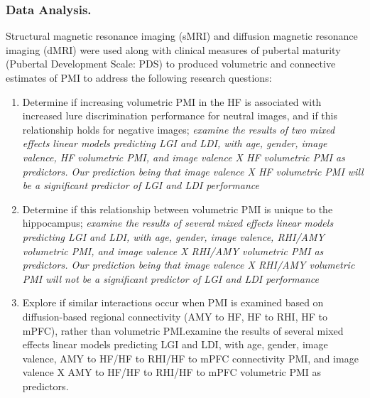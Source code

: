 \documentclass[11pt]{article}
\begin{document}
\subsubsection*{Data Analysis.} Structural magnetic resonance imaging (sMRI) and
diffusion magnetic resonance imaging (dMRI) were used along with clinical measures of
pubertal maturity (Pubertal Development Scale: {PDS}) to produced volumetric and
connective estimates of PMI to address the following research questions:
\begin{enumerate}
    \item Determine if increasing volumetric PMI in the HF is associated with increased
          lure discrimination performance for neutral images, and if this relationship holds for
          negative images; \textit{examine the results of two mixed effects linear models predicting LGI and LDI, with
              age, gender, image valence, HF volumetric PMI, and image valence X HF volumetric PMI as predictors. Our prediction being
              that image valence X HF volumetric PMI will be a significant predictor of LGI and LDI performance}
    \item Determine if this relationship between volumetric PMI is unique to the
          hippocampus; \textit{examine the results of several mixed effects linear models predicting LGI and LDI, with
              age, gender, image valence, RHI/AMY volumetric PMI, and image valence X RHI/AMY volumetric PMI as predictors. Our prediction being
              that image valence X RHI/AMY volumetric PMI will not be a significant predictor of LGI and LDI performance}
    \item Explore if similar interactions occur when PMI is examined based on
          diffusion-based regional connectivity (AMY to HF, HF to RHI, HF to mPFC), rather than volumetric PMI.{examine the results of several mixed effects linear models predicting LGI and LDI, with
                  age, gender, image valence, AMY to HF/HF to RHI/HF to mPFC connectivity PMI, and image valence X AMY to HF/HF to RHI/HF to mPFC volumetric PMI as predictors.}
\end{enumerate}
\end{document}
